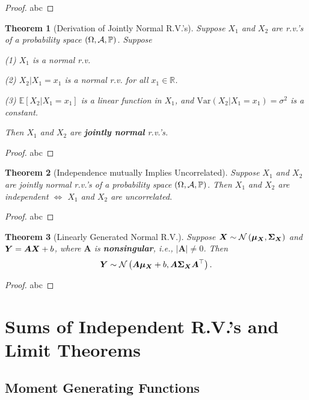 \documentclass[openany,12pt]{book}
\newtheorem{theorem}{Theorem}[chapter]
\begin{document}
\begin{proof}
  abc
\end{proof}

\begin{theorem}[Derivation of Jointly Normal R.V.'s]
Suppose $X_{1}$ and $X_{2}$ are r.v.'s of a probability space $(\Omega,\mathcal{A},\mathbb{P})$. Suppose

(1) $X_{1}$ is a normal r.v.

(2) $X_{2}|X_{1} = x_{1}$ is a normal r.v. for all
$x_{1}\mathbb{\in R}$.

(3) $\mathbb{E}[ X_{2} | X_{1} = x_{1}]$ is a
linear function in $X_{1}$, and
$\mathrm{Var}( X_{2}| X_{1} = x_{1}) = \sigma^{2}$
is a constant.

Then $X_{1}$ and $X_{2}$ are \textbf{jointly normal} r.v.'s.
\end{theorem}

\begin{proof}
  abc
\end{proof}

\begin{theorem}[Independence mutually Implies Uncorrelated]
Suppose $X_{1}$ and $X_{2}$ are jointly normal r.v.'s of a probability space $(\Omega,\mathcal{A},\mathbb{P})$. Then $X_{1}$ and $X_{2}$ are independent 
$\Leftrightarrow$ $X_{1}$ and $X_{2}$ are uncorrelated.
\end{theorem}

\begin{proof}
  abc
\end{proof}

\begin{theorem}[Linearly Generated Normal R.V.]
Suppose $\bm{X}\sim \mathcal{N}\left( {\bm{\mu}}_{\bm{X}},\bm{\Sigma}_{\bm{X}} \right)$ and $\bm{Y}= \bm{A}\bm{X} + b$, where $\bm{A}$ is \textbf{nonsingular}, i.e., $|\bm{A}| \neq 0$.
Then
\[\bm{Y}\sim \mathcal{N}\left( \bm{A}{\bm{\mu}}_{\bm{X}} + b,\bm{A}\bm{\Sigma}_{\bm{X}}\bm{A}^{\top} \right).\]
\end{theorem}

\begin{proof}
  abc
\end{proof}

\chapter{Sums of Independent R.V.'s and Limit Theorems}

\section{Moment Generating Functions}
\end{document}
